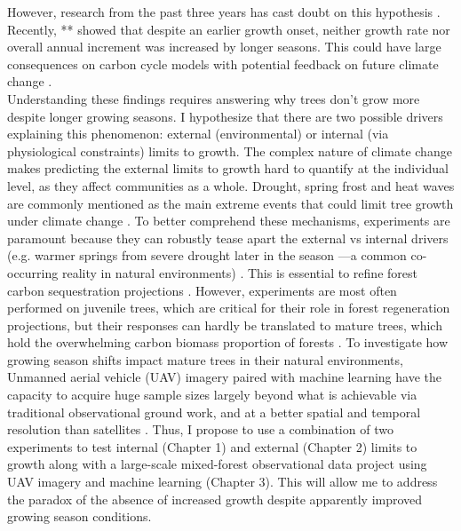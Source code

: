 \documentclass[12pt]{article}
\begin{document}
However, research from the past three years has cast doubt on this hypothesis \citep{dow_warm_2022,green_limits_2022,silvestro_longer_2023}. Recently, \citep{dow_warm_2022}** showed that despite an earlier growth onset, neither growth rate nor overall annual increment was increased by longer seasons. This could have large consequences on carbon cycle models with potential feedback on future climate change \citep{richardson_climate_2013,swidrak_comparing_2013}.\\
Understanding these findings requires answering why trees don't grow more despite longer growing seasons. I hypothesize that there are two possible drivers explaining this phenomenon: external (environmental) \citep{kolar_response_2016} or internal (via physiological constraints)\citep{zohner_effect_2023} limits to growth. The complex nature of climate change makes predicting the external limits to growth hard to quantify at the individual level, as they affect communities as a whole. Drought, spring frost and heat waves are commonly mentioned as the main extreme events that could limit tree growth under climate change \citep{tyree_xylem_2002, choat_triggers_2018, li_widespread_2023,trenberth_global_2014,intergovernmental_panel_on_climate_change_detection_2014,chiang_evidence_2021,polgar_leafout_2011,reinmann_compensatory_2023}. To better comprehend these mechanisms, experiments are paramount because they can robustly tease apart the external vs internal drivers (e.g. warmer springs from severe drought later in the season ---a common co-occurring reality in natural environments) \citep{morin_changes_2010,primack_observations_2015}. This is essential to refine forest carbon sequestration projections \citep{green_limits_2022,cabon_cross-biome_2022}. However, experiments are most often performed on juvenile trees, which are critical for their role in forest regeneration projections, but their responses can hardly be translated to mature trees, which hold the overwhelming carbon biomass proportion of forests \citep{augspurger_differences_2003,silvestro_longer_2023,vitasse_ontogenic_2013}. To investigate how growing season shifts impact mature trees in their natural environments, Unmanned aerial vehicle (UAV) imagery paired with machine learning have the capacity to acquire huge sample sizes largely beyond what is achievable via traditional observational ground work, and at a better spatial and temporal resolution than satellites \citep{berra_assessing_2019,piao_plant_2019,teng_bringing_2025}. Thus, I propose to use a combination of two experiments to test internal (Chapter 1) and external (Chapter 2) limits to growth along with a large-scale mixed-forest observational data project using UAV imagery and machine learning (Chapter 3). This will allow me to address the paradox of the absence of increased growth despite apparently improved growing season conditions. \\
\end{document}
